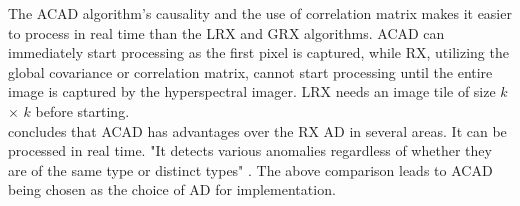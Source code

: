  The ACAD algorithm's causality and the use of correlation matrix makes it easier to process in real time than the LRX and GRX algorithms. ACAD can immediately start processing as the first pixel is captured, while RX, utilizing the global covariance or correlation matrix, cannot start processing until the entire image is captured by the hyperspectral imager. LRX needs an image tile of size $k$ $\times$ $k$ before starting.\\
 
 \cite{chang2006characterization} concludes that ACAD has advantages over the RX AD in several areas. It can be processed in real time. "It detects various anomalies regardless of whether they are of the same type or distinct types" \cite{chang2006characterization}. The above comparison leads to ACAD being chosen as the choice of AD for implementation. 
 
 
